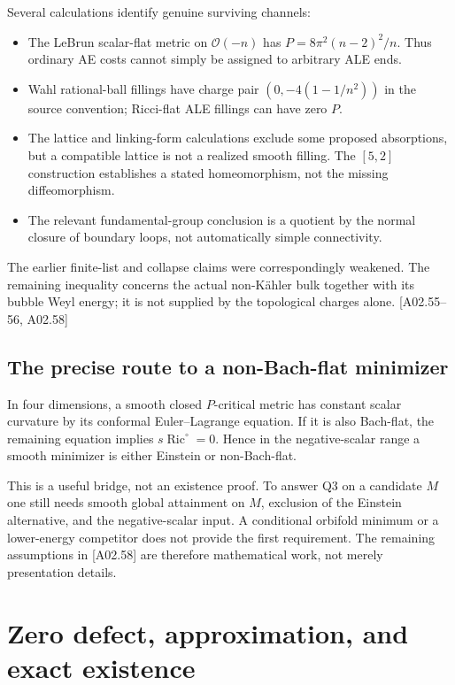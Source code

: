 \documentclass[11pt]{article}
\newcommand{\Ric}{\operatorname{Ric}}
\newcommand{\sref}[1]{\textsf{[#1]}}
\theoremstyle{remark}
\begin{document}
Several calculations identify genuine surviving channels:
\begin{itemize}
\item The LeBrun scalar-flat metric on $\mathcal O(-n)$ has
$P=8\pi^2(n-2)^2/n$. Thus ordinary AE costs cannot simply be assigned to
arbitrary ALE ends.
\item Wahl rational-ball fillings have charge pair
$(0,-4(1-1/n^2))$ in the source convention; Ricci-flat ALE fillings can have
zero $P$.
\item The lattice and linking-form calculations exclude some proposed
absorptions, but a compatible lattice is not a realized smooth filling.
The $[5,2]$ construction establishes a stated homeomorphism, not the missing
diffeomorphism.
\item The relevant fundamental-group conclusion is a quotient by the normal
closure of boundary loops, not automatically simple connectivity.
\end{itemize}
The earlier finite-list and collapse claims were correspondingly weakened.
The remaining inequality concerns the actual non-K\"ahler bulk together
with its bubble Weyl energy; it is not supplied by the topological charges
alone. \sref{A02.55--56, A02.58}

\subsection{The precise route to a non-Bach-flat minimizer}
In four dimensions, a smooth closed $P$-critical metric has constant scalar
curvature by its conformal Euler--Lagrange equation. If it is also Bach-flat,
the remaining equation implies $s\Ric^\circ=0$. Hence in the negative-scalar
range a smooth minimizer is either Einstein or non-Bach-flat.

This is a useful bridge, not an existence proof. To answer Q3 on a candidate
$M$ one still needs smooth global attainment on $M$, exclusion of the
Einstein alternative, and the negative-scalar input. A conditional orbifold
minimum or a lower-energy competitor does not provide the first requirement.
The remaining assumptions in \sref{A02.58} are therefore mathematical
work, not merely presentation details.

\section{Zero defect, approximation, and exact existence}
\end{document}

